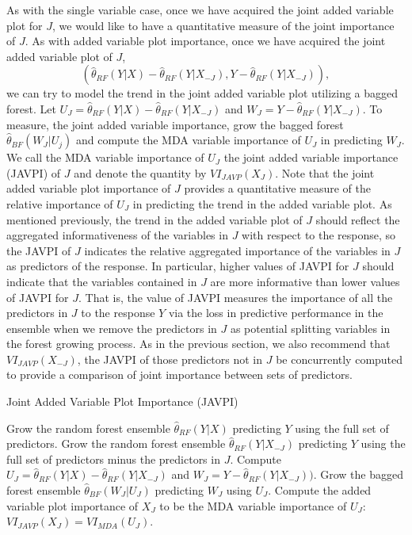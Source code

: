 \documentclass[12pt,twoside]{reedthesis}
\theoremstyle{definition}
\theoremstyle{definition}
\theoremstyle{definition}
\theoremstyle{remark}
\begin{document}
As with the single variable case, once we have acquired the joint added
variable plot for \(J\), we would like to have a quantitative measure of
the joint importance of \(J\). As with added variable plot importance,
once we have acquired the joint added variable plot of \(J\),
\[(\hat{\theta}_{RF}(Y|X)-\hat{\theta}_{RF}(Y|X_{-J}), Y-\hat{\theta}_{RF}(Y|X_{-J})),\]
we can try to model the trend in the joint added variable plot utilizing
a bagged forest. Let
\(U_J=\hat{\theta}_{RF}(Y|X)-\hat{\theta}_{RF}(Y|X_{-J})\) and
\(W_J=Y-\hat{\theta}_{RF}(Y|X_{-J})\). To measure, the joint added
variable importance, grow the bagged forest
\(\hat{\theta}_{BF}(W_J|U_j)\) and compute the MDA variable importance
of \(U_J\) in predicting \(W_J\). We call the MDA variable importance of
\(U_J\) the joint added variable importance (JAVPI) of \(J\) and denote
the quantity by \(VI_{JAVP}(X_J)\). Note that the joint added variable
plot importance of \(J\) provides a quantitative measure of the relative
importance of \(U_J\) in predicting the trend in the added variable
plot. As mentioned previously, the trend in the added variable plot of
\(J\) should reflect the aggregated informativeness of the variables in
\(J\) with respect to the response, so the JAVPI of \(J\) indicates the
relative aggregated importance of the variables in \(J\) as predictors
of the response. In particular, higher values of JAVPI for \(J\) should
indicate that the variables contained in \(J\) are more informative than
lower values of JAVPI for \(J\). That is, the value of JAVPI measures
the importance of all the predictors in \(J\) to the response \(Y\) via
the loss in predictive performance in the ensemble when we remove the
predictors in \(J\) as potential splitting variables in the forest
growing process. As in the previous section, we also recommend that
\(VI_{JAVP}(X_{-J})\), the JAVPI of those predictors not in \(J\) be
concurrently computed to provide a comparison of joint importance
between sets of predictors. \par
\begin{algorithm}
    \caption{Joint Added Variable Plot Importance (JAVPI)} \label{added variable importance}
      \begin{algorithmic}[1]
          \State Grow the random forest ensemble $\hat{\theta}_{RF}(Y|X)$ predicting $Y$ using the full set of predictors.
          \State Grow the random forest ensemble $\hat{\theta}_{RF}(Y|X_{-J})$ predicting $Y$ using the full set of predictors minus the predictors in $J$.
          \State Compute $U_J=\hat{\theta}_{RF}(Y|X)-\hat{\theta}_{RF}(Y|X_{-J})$ and $W_J=Y-\hat{\theta}_{RF}(Y|X_{-J})).$
          \State Grow the bagged forest ensemble $\hat{\theta}_{BF}(W_J|U_J)$ predicting $W_J$ using $U_J$. 
          \State Compute the added variable plot importance of $X_J$ to be the MDA variable importance of $U_J$: $VI_{JAVP}(X_J)=VI_{MDA}(U_J)$.
          
      \end{algorithmic}
  \end{algorithm}
\end{document}

